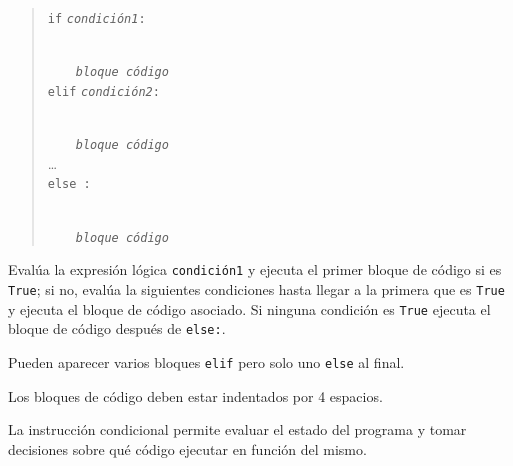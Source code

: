 \documentclass[
  spanish,
  a4paper,
]{scrreport}
\begin{document}
\begin{quote}
\texttt{if} \emph{\texttt{condición1}}\texttt{:}\strut \\
    \emph{\texttt{bloque\ código}}\\
\texttt{elif} \emph{\texttt{condición2}}\texttt{:}\strut \\
    \emph{\texttt{bloque\ código}}\\
\ldots{}\\
\texttt{else\ :}\strut \\
    \emph{\texttt{bloque\ código}}
\end{quote}

Evalúa la expresión lógica \texttt{condición1} y ejecuta el primer
bloque de código si es \texttt{True}; si no, evalúa la siguientes
condiciones hasta llegar a la primera que es \texttt{True} y ejecuta el
bloque de código asociado. Si ninguna condición es \texttt{True} ejecuta
el bloque de código después de \texttt{else:}.

Pueden aparecer varios bloques \texttt{elif} pero solo uno \texttt{else}
al final.

\begin{tcolorbox}[enhanced jigsaw, arc=.35mm, bottomrule=.15mm, bottomtitle=1mm, breakable, colback=white, colbacktitle=quarto-callout-warning-color!10!white, colframe=quarto-callout-warning-color-frame, coltitle=black, left=2mm, leftrule=.75mm, opacityback=0, opacitybacktitle=0.6, rightrule=.15mm, title=\textcolor{quarto-callout-warning-color}{\faExclamationTriangle}\hspace{0.5em}{Advertencia}, titlerule=0mm, toprule=.15mm, toptitle=1mm]

Los bloques de código deben estar indentados por 4 espacios.

\end{tcolorbox}

La instrucción condicional permite evaluar el estado del programa y
tomar decisiones sobre qué código ejecutar en función del mismo.
\end{document}
